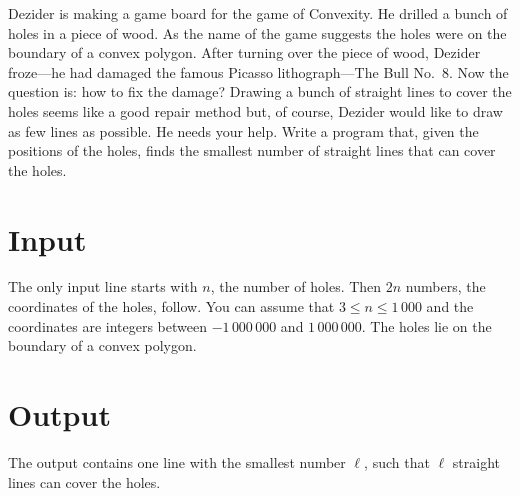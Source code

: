 
Dezider is making a game board for the game of Convexity. He drilled a
bunch of holes in a piece of wood. As the name of the game suggests
the holes were on the boundary of a convex polygon. After turning over
the piece of wood, Dezider froze---he had damaged the famous Picasso
lithograph---The Bull No.~8. Now the question is: how to fix the
damage?  Drawing a bunch of straight lines to cover the holes seems
like a good repair method but, of course, Dezider would like to draw
as few lines as possible. He needs your help. Write a program that,
given the positions of the holes, finds the smallest number of
straight lines that can cover the holes.


\section*{Input}

The only input line starts with
$n$, the number of holes. Then $2n$ numbers, the coordinates of the
holes, follow. You can assume that $3 \leq n \leq 1\,000$ and the
coordinates are integers between $-1\,000\,000$ and $1\,000\,000$. The
holes lie on the boundary of a convex polygon.


\section*{Output}

The output contains one line with the
smallest number $\ell$, such that $\ell$ straight lines can cover the holes.
